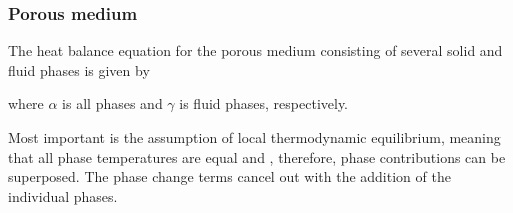 \subsubsection{Porous medium}

The heat balance equation for the porous medium consisting of several solid and fluid phases
is given by

%
where $\alpha$ is all phases and $\gamma$ is fluid phases, respectively.

%
Most important is the assumption of local thermodynamic equilibrium, meaning that all phase temperatures are equal and , therefore, phase contributions can be superposed.
The phase change terms cancel out with the addition of the individual phases. 
